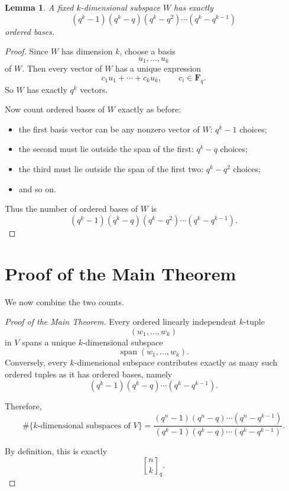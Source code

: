 \documentclass[11pt]{article}
\newtheorem{lemma}[theorem]{Lemma}
\theoremstyle{definition}
\theoremstyle{remark}
\newcommand{\F}{\mathbf{F}}
\newcommand{\Span}{\operatorname{span}}
\newcommand{\qbinom}[2]{\genfrac{[}{]}{0pt}{}{#1}{#2}_q}
\begin{document}
	\begin{lemma}
		A fixed \(k\)-dimensional subspace \(W\) has exactly
		\[
		(q^k-1)(q^k-q)(q^k-q^2)\cdots(q^k-q^{k-1})
		\]
		ordered bases.
	\end{lemma}
	
	\begin{proof}
		Since \(W\) has dimension \(k\), choose a basis
		\[
		u_1,\dots,u_k
		\]
		of \(W\). Then every vector of \(W\) has a unique expression
		\[
		c_1u_1+\cdots+c_ku_k,
		\qquad c_i\in \F_q.
		\]
		So \(W\) has exactly \(q^k\) vectors.
		
		Now count ordered bases of \(W\) exactly as before:
		
		\begin{itemize}
			\item the first basis vector can be any nonzero vector of \(W\): \(q^k-1\) choices;
			\item the second must lie outside the span of the first: \(q^k-q\) choices;
			\item the third must lie outside the span of the first two: \(q^k-q^2\) choices;
			\item and so on.
		\end{itemize}
		
		Thus the number of ordered bases of \(W\) is
		\[
		(q^k-1)(q^k-q)(q^k-q^2)\cdots(q^k-q^{k-1}).
		\]
	\end{proof}
	
	\section{Proof of the Main Theorem}
	
	We now combine the two counts.
	
	\begin{proof}[Proof of the Main Theorem]
		Every ordered linearly independent \(k\)-tuple
		\[
		(w_1,\dots,w_k)
		\]
		in \(V\) spans a unique \(k\)-dimensional subspace
		\[
		\Span(w_1,\dots,w_k).
		\]
		Conversely, every \(k\)-dimensional subspace contributes exactly as many such ordered tuples as it has ordered bases, namely
		\[
		(q^k-1)(q^k-q)\cdots(q^k-q^{k-1}).
		\]
		
		Therefore,
		\[
		\#\{\text{\(k\)-dimensional subspaces of }V\}
		=
		\frac{(q^n-1)(q^n-q)\cdots(q^n-q^{k-1})}
		{(q^k-1)(q^k-q)\cdots(q^k-q^{k-1})}.
		\]
		
		By definition, this is exactly
		\[
		\qbinom{n}{k}.
		\]
	\end{proof}
	
\end{document}

